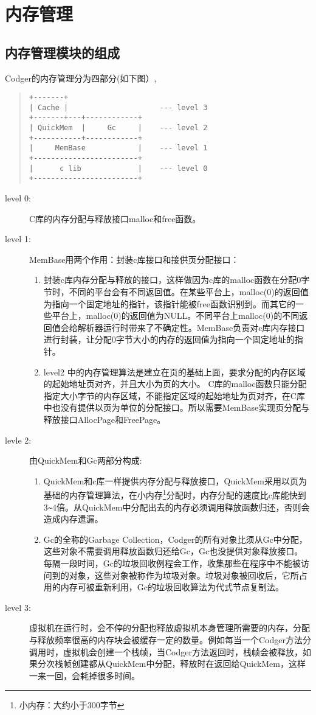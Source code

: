 \section{内存管理}
\subsection{内存管理模块的组成}
Codger的内存管理分为四部分(如下图）,
\begin{quote}
\begin{verbatim}
+-------+
| Cache |                     --- level 3
+-------+---+------------+ 
| QuickMem  |     Gc     |    --- level 2
+-----------+------------+
|     MemBase            |    --- level 1
+------------------------+
|      c lib             |    --- level 0
+------------------------+
\end{verbatim}
\end{quote}
\begin{description}
\item[level 0:] C库的内存分配与释放接口malloc和free函数。
\item[level 1:] MemBase用两个作用：封装c库接口和接供页分配接口：
\begin{enumerate}
\item 封装c库内存分配与释放的接口，这样做因为c库的malloc函数在分配0字节时，不同的平台会有不同返回值。在某些平台上，malloc(0)的返回值为指向一个固定地址的指针，该指针能被free函数识别到。而其它的一些平台上，malloc(0)的返回值为NULL。不同平台上malloc(0)的不同返回值会给解析器运行时带来了不确定性。MemBase负责对c库内存接口进行封装，让分配0字节大小的内存的返回值为指向一个固定地址的指针。
\item level2 中的内存管理算法是建立在页的基础上面，要求分配的内存区域的起始地址页对齐，并且大小为页的大小。 C库的malloc函数只能分配指定大小字节的内存区域，不能指定区域的起始地址为页对齐，在C库中也没有提供以页为单位的分配接口。所以需要MemBase实现页分配与释放接口AllocPage和FreePage。
\end{enumerate}
\item[levle 2:] 由QuickMem和Gc两部分构成:
\begin{enumerate}
\item QuickMem和c库一样提供内存分配与释放接口，QuickMem采用以页为基础的内存管理算法，在小内存\footnote{小内存：大约小于300字节}分配时，内存分配的速度比c库能快到3\verb|~|4倍。从QuickMem中分配出去的内存必须调用释放函数归还，否则会造成内存遗漏。
\item Gc的全称的Garbage Collection，Codger的所有对象比须从Gc中分配，这些对象不需要调用释放函数归还给Gc，Gc也没提供对象释放接口。每隔一段时间，Gc的垃圾回收例程会工作，收集那些在程序中不能被访问到的对象，这些对象被称作为垃圾对象。垃圾对象被回收后，它所占用的内存可被重新利用，Gc的垃圾回收算法为代式节点复制法。
\end{enumerate}
\item[level 3:] 虚拟机在运行时，会不停的分配也释放虚拟机本身管理所需要的内存，分配与释放频率很高的内存块会被缓存一定的数量。例如每当一个Codger方法分调用时，虚拟机会创建一个栈帧，当Codger方法返回时，栈帧会被释放，如果分次栈帧创建都从QuickMem中分配，释放时在返回给QuickMem，这样一来一回，会耗掉很多时间。
\end{description}

